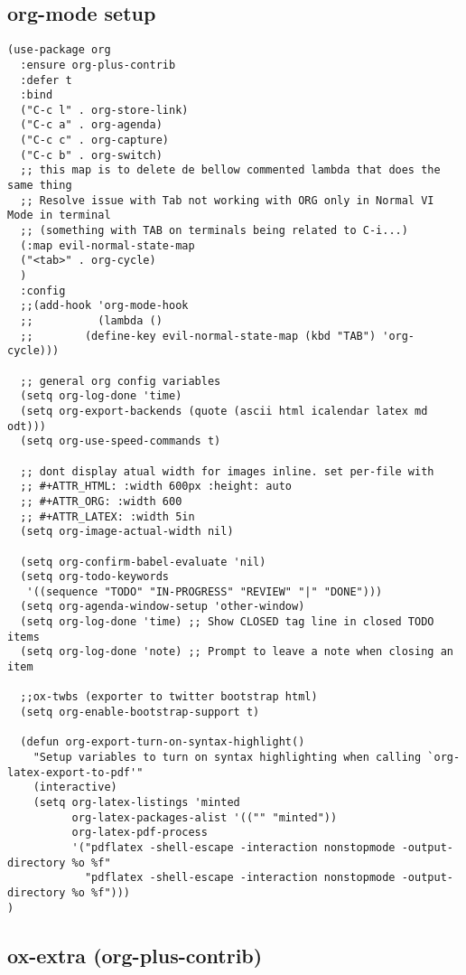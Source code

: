 \documentclass[11pt]{article}
\begin{document}
\subsection*{org-mode setup}
\label{sec:orgaeb7fc4}
\begin{verbatim}
(use-package org
  :ensure org-plus-contrib
  :defer t
  :bind
  ("C-c l" . org-store-link)
  ("C-c a" . org-agenda)
  ("C-c c" . org-capture)
  ("C-c b" . org-switch)
  ;; this map is to delete de bellow commented lambda that does the same thing
  ;; Resolve issue with Tab not working with ORG only in Normal VI Mode in terminal
  ;; (something with TAB on terminals being related to C-i...)
  (:map evil-normal-state-map
  ("<tab>" . org-cycle)
  )
  :config
  ;;(add-hook 'org-mode-hook
  ;;          (lambda ()
  ;;        (define-key evil-normal-state-map (kbd "TAB") 'org-cycle)))

  ;; general org config variables
  (setq org-log-done 'time)
  (setq org-export-backends (quote (ascii html icalendar latex md odt)))
  (setq org-use-speed-commands t)

  ;; dont display atual width for images inline. set per-file with
  ;; #+ATTR_HTML: :width 600px :height: auto
  ;; #+ATTR_ORG: :width 600
  ;; #+ATTR_LATEX: :width 5in
  (setq org-image-actual-width nil)

  (setq org-confirm-babel-evaluate 'nil)
  (setq org-todo-keywords
   '((sequence "TODO" "IN-PROGRESS" "REVIEW" "|" "DONE")))
  (setq org-agenda-window-setup 'other-window)
  (setq org-log-done 'time) ;; Show CLOSED tag line in closed TODO items
  (setq org-log-done 'note) ;; Prompt to leave a note when closing an item

  ;;ox-twbs (exporter to twitter bootstrap html)
  (setq org-enable-bootstrap-support t)

  (defun org-export-turn-on-syntax-highlight()
    "Setup variables to turn on syntax highlighting when calling `org-latex-export-to-pdf'"
    (interactive)
    (setq org-latex-listings 'minted
          org-latex-packages-alist '(("" "minted"))
          org-latex-pdf-process
          '("pdflatex -shell-escape -interaction nonstopmode -output-directory %o %f"
            "pdflatex -shell-escape -interaction nonstopmode -output-directory %o %f")))
)
\end{verbatim}

\subsection*{ox-extra (org-plus-contrib)}
\label{sec:orgdcfbbaa}
\end{document}
